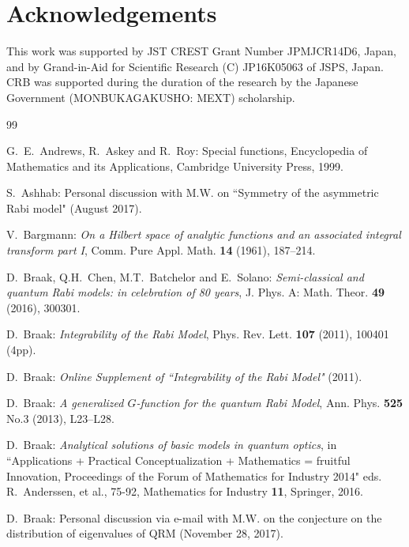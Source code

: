 \documentclass[11pt]{article}
\numberwithin{equation}{section}
\theoremstyle{plain}
\theoremstyle{definition}
\theoremstyle{remark}
\begin{document}
\section*{Acknowledgements}
This work was supported by JST CREST Grant Number JPMJCR14D6, Japan, and
by Grand-in-Aid for Scientific Research (C) JP16K05063 of JSPS, Japan.
CRB was supported during the duration of the research by the Japanese
Government (MONBUKAGAKUSHO: MEXT) scholarship.  



\begin{thebibliography}{99}

  G.~E.~Andrews, R.~Askey and R.~Roy:
  Special functions, Encyclopedia of Mathematics and its Applications, Cambridge University Press, 1999.

S.~Ashhab: Personal discussion with M.W. on ``Symmetry of the asymmetric Rabi model" (August 2017).

  V.~Bargmann:
  \textit{On a Hilbert space of analytic functions and an associated integral transform part I},
  Comm. Pure Appl. Math. \textbf{14} (1961), 187--214.

  D.~Braak, Q.H.~Chen, M.T.~Batchelor and E.~Solano:
  \textit{Semi-classical and quantum Rabi models: in celebration of 80 years},
  J. Phys. A: Math. Theor. \textbf{49} (2016), 300301.

  D.~Braak:
  \textit{Integrability of the Rabi Model},
  Phys. Rev. Lett. \textbf{107} (2011), 100401 (4pp).

 D.~Braak:
  \textit{Online Supplement of ``Integrability of the Rabi Model"} (2011).

  D.~Braak:
  \textit{A generalized $G$-function for the quantum Rabi Model},
  Ann. Phys. \textbf{525} No.3 (2013), L23--L28.

  D.~Braak:
  \textit{Analytical solutions of basic models in quantum optics},
  in ``Applications + Practical Conceptualization + Mathematics = fruitful Innovation, Proceedings of the Forum of Mathematics for Industry 2014" eds. R.~Anderssen, et al., 75-92, Mathematics for Industry \textbf{11}, Springer, 2016.

  D.~Braak: Personal discussion via e-mail with M.W. on the conjecture on the distribution of eigenvalues of QRM (November 28, 2017).
  

\end{thebibliography}
\end{document}
